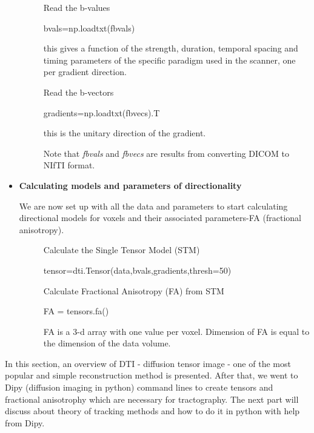 \begin{itemize}
\begin{description}
		\item[]
		Read the b-values
\begin{python}
bvals=np.loadtxt(fbvals)
\end{python}

		this gives a function of the strength, duration, temporal spacing and timing parameters of the 	specific paradigm used in the scanner, one per gradient direction.

		\item[]
		Read the b-vectors
\begin{python}
gradients=np.loadtxt(fbvecs).T
\end{python}
		this is the unitary direction of the gradient.
		\item[]
		Note that \textit{fbvals} and \textit{fbvecs} are results from converting DICOM to NIfTI format.
	\end{description}
	
\item \textbf{Calculating models and parameters of directionality}

We are now set up with all the data and parameters to start calculating directional models for voxels and their associated parameters-FA (fractional anisotropy).

	\begin{description}
		\item[]
		Calculate the Single Tensor Model (STM)
\begin{python}
tensor=dti.Tensor(data,bvals,gradients,thresh=50) 
\end{python}

		\item[]
		Calculate Fractional Anisotropy (FA) from STM
\begin{python}
FA = tensors.fa()
\end{python}

		FA is a 3-d array with one value per voxel. Dimension of FA is equal to the dimension of the data volume.

	\end{description}
\end{itemize}

In this section, an overview of DTI - diffusion tensor image - one of the most popular and simple reconstruction method is presented. After that, we went to Dipy (diffusion imaging in python) command lines to create tensors and fractional anisotrophy which are necessary for tractography. The next part will discuss about theory of tracking methods and how to do it in python with help from Dipy.





